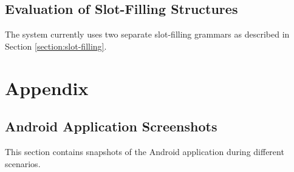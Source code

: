 \documentclass[11pt]{article}
\begin{document}
\subsection{Evaluation of Slot-Filling Structures}

The system currently uses two separate slot-filling grammars as described in Section \ref{section:slot-filling}.
































































































\newpage
\section{Appendix}
\subsection{Android Application Screenshots}
This section contains snapshots of the Android application during different scenarios.
\label{appendix:screenshots}
\end{document}
